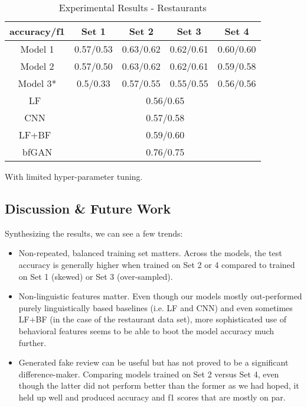 \documentclass[conference, 11pt]{IEEEtran} %
\theoremstyle{plain}
\theoremstyle{definition}
\begin{document}
\begin{table}[H]
\small
\caption{Experimental Results - Restaurants}
\centering
\begin{tabular}{|c|c|c|c|c|}
\hline
 accuracy/f1 & Set 1 & Set 2 & Set 3 & Set 4 \\ \hline
Model 1 & 0.57/0.53 & 0.63/0.62 & 0.62/0.61 & 0.60/0.60 \\ \hline
Model 2 & 0.57/0.50 & 0.63/0.62 & 0.62/0.61 & 0.59/0.58 \\ \hline
Model 3* & 0.5/0.33 & 0.57/0.55 & 0.55/0.55 & 0.56/0.56 \\ \hline
LF~\cite{Tang2020} & \multicolumn{4}{c|}{0.56/0.65} \\ \hline
CNN~\cite{Tang2020} & \multicolumn{4}{c|}{0.57/0.58} \\ \hline
LF+BF~\cite{Tang2020} & \multicolumn{4}{c|}{0.59/0.60} \\ \hline
bfGAN\cite{Tang2020}& \multicolumn{4}{c|}{0.76/0.75} \\
\hline
\end{tabular}
\label{exp-restaurants}
\end{table}

\vspace{-1.5em}

{\footnotesize * With limited hyper-parameter tuning.}


\subsection{Discussion \& Future Work}
Synthesizing the results, we can see a few trends:
\begin{itemize}
\item Non-repeated, balanced training set matters. Across the models, the test accuracy is generally higher when trained on Set 2 or 4 compared to trained on Set 1 (skewed) or Set 3 (over-sampled).
\item Non-linguistic features matter. Even though our models mostly out-performed purely linguistically based baselines (i.e. LF and CNN) and even sometimes LF+BF (in the case of the restaurant data set), more sophisticated use of behavioral features seems to be able to boot the model accuracy much further.
\item Generated fake review can be useful but has not proved to be a significant difference-maker. Comparing models trained on Set 2 versus Set 4, even though the latter did not perform better than the former as we had hoped, it held up well and produced accuracy and f1 scores that are mostly on par.
\end{itemize}
\end{document}

